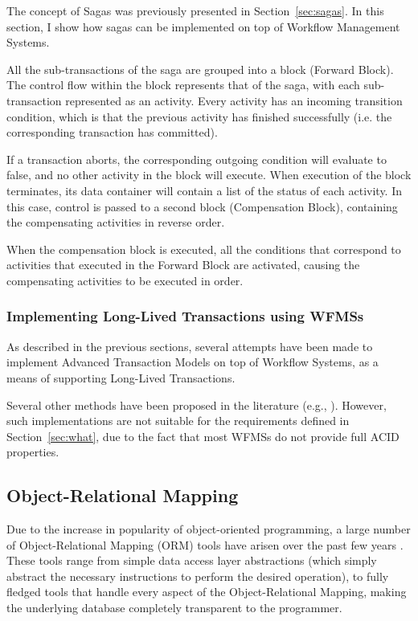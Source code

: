 \documentclass{llncs}
\begin{document}
The concept of Sagas was previously presented in
Section~\ref{sec:sagas}. In this section, I show how sagas can be
implemented on top of Workflow Management Systems.

All the sub-transactions of the saga are grouped into a block (Forward
Block). The control flow within the block represents that of the saga,
with each sub-transaction represented as an activity. Every activity
has an incoming transition condition, which is that the previous
activity has finished successfully (i.e. the corresponding transaction
has committed).

If a transaction aborts, the corresponding outgoing condition will
evaluate to false, and no other activity in the block will
execute. When execution of the block terminates, its data container
will contain a list of the status of each activity. In this case,
control is passed to a second block (Compensation Block), containing
the compensating activities in reverse order.

When the compensation block is executed, all the conditions that
correspond to activities that executed in the Forward Block are
activated, causing the compensating activities to be executed in
order.

\subsubsection{Implementing Long-Lived Transactions using WFMSs}

As described in the previous sections, several attempts have been made
to implement Advanced Transaction Models on top of Workflow Systems,
as a means of supporting Long-Lived Transactions.

Several other methods have been proposed in the literature (e.g.,
\cite{alonso1996advanced, 798492}). However, such implementations are
not suitable for the requirements defined in Section~\ref{sec:what},
due to the fact that most WFMSs do not provide full ACID properties.

\subsection{Object-Relational Mapping}
\label{sec:orm}

Due to the increase in popularity of object-oriented programming, a
large number of Object-Relational Mapping (ORM) tools have arisen over
the past few years \cite{orm}. These tools range from simple data
access layer abstractions (which simply abstract the necessary
instructions to perform the desired operation), to fully fledged
tools that handle every aspect of the Object-Relational Mapping,
making the underlying database completely transparent to the
programmer.
\end{document}

